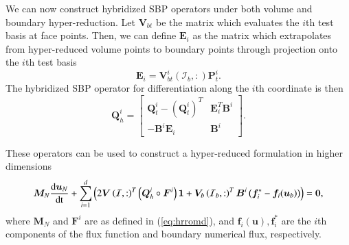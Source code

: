 \documentclass[preprint,10pt]{elsarticle}
\theoremstyle{definition}
\theoremstyle{lemma}
\theoremstyle{theorem}
\theoremstyle{assumption}
\newcommand{\td}[2]{\frac{{\rm d}#1}{{\rm d}{\rm #2}}}
\newcommand{\LRp}[1]{\left( #1 \right)}
\begin{document}
We can now construct hybridized SBP operators under both volume and boundary hyper-reduction.  Let $\bm{V}_{bt}$ be the matrix which evaluates the $i$th test basis at face points.  Then, we can define $\bm{E}_i$ as the matrix which extrapolates from hyper-reduced volume points to boundary points through projection onto the $i$th test basis
\[
\bm{E}_i = \bm{V}_{bt}^i\LRp{\mathcal{I}_b,:}\bm{P}^i_t.  
\]
The hybridized SBP operator for differentiation along the $i$th coordinate is then
\[
\bm{Q}_h^i = \begin{bmatrix}
\bm{Q}^i_t - \LRp{\bm{Q}^i_t}^T & \bm{E}_i^T\bm{B}^i \\ 
-\bm{B}^i\bm{E}_i & \bm{B}^i
\end{bmatrix}.
\]

These operators can be used to construct a hyper-reduced formulation in higher dimensions
\begin{gather}
\bm{M}_N\td{\bm{u}_N}{t} + \sum_{i=1}^d \LRp{2\bm{V}\LRp{\mathcal{I},:}^T\LRp{\bm{Q}^i_h \circ \bm{F}^i}\bm{1} + \bm{V}_b\LRp{\mathcal{I}_b,:}^T\bm{B}^i\LRp{\bm{f}_i^* - \bm{f}_i(\bm{u}_b)}} = \bm{0} \label{eq:hrromdbc},%
\end{gather}
where $\bm{M}_N$ and $\bm{F}^i$ are as defined in (\ref{eq:hrromd}), and $\bm{f}_i(\bm{u}), \bm{f}_i^*$ are the $i$th components of the flux function and boundary numerical flux, respectively.  
\end{document}
